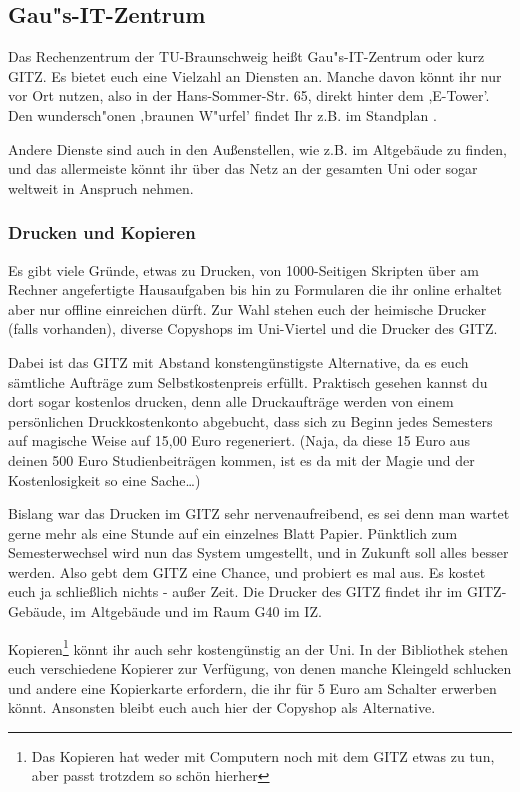 \subsection{Gau"s-IT-Zentrum}
Das Rechenzentrum der TU-Braunschweig heißt Gau"s-IT-Zentrum oder kurz GITZ. Es bietet euch eine Vielzahl an Diensten an. Manche davon könnt ihr nur vor Ort nutzen, also in der Hans-Sommer-Str. 65, direkt hinter dem ,E-Tower'. Den wundersch"onen ,braunen W"urfel' findet Ihr z.B. im Standplan .

Andere Dienste sind auch in den Außenstellen, wie z.B. im Altgebäude zu finden, und das allermeiste könnt ihr über das Netz an der gesamten Uni oder sogar weltweit in Anspruch nehmen.

\subsubsection{Drucken und Kopieren}
Es gibt viele Gründe, etwas zu Drucken, von 1000-Seitigen Skripten über am Rechner angefertigte Hausaufgaben bis hin zu Formularen die ihr online erhaltet aber nur offline einreichen dürft. Zur Wahl stehen euch der heimische Drucker (falls vorhanden), diverse Copyshops im Uni-Viertel und die Drucker des GITZ.

Dabei ist das GITZ mit Abstand konstengünstigste Alternative, da es euch sämtliche Aufträge zum Selbstkostenpreis erfüllt. Praktisch gesehen kannst du dort sogar kostenlos drucken, denn alle Druckaufträge werden von einem persönlichen Druckkostenkonto abgebucht, dass sich zu Beginn jedes Semesters auf magische Weise auf 15,00 Euro regeneriert. (Naja, da diese 15 Euro aus deinen 500 Euro Studienbeiträgen kommen, ist es da mit der Magie und der Kostenlosigkeit so eine Sache\ldots)

Bislang war das Drucken im GITZ sehr nervenaufreibend, es sei denn man wartet gerne mehr als eine Stunde auf ein einzelnes Blatt Papier. Pünktlich zum Semesterwechsel wird nun das System umgestellt, und in Zukunft soll alles besser werden. Also gebt dem GITZ eine Chance, und probiert es mal aus. Es kostet euch ja schließlich nichts - außer Zeit. Die Drucker des GITZ findet ihr im GITZ-Gebäude, im Altgebäude und im Raum G40 im IZ.

Kopieren\footnote{Das Kopieren hat weder mit Computern noch mit dem GITZ etwas zu tun, aber passt trotzdem so schön hierher} könnt ihr auch sehr kostengünstig an der Uni. In der Bibliothek stehen euch verschiedene Kopierer zur Verfügung, von denen manche Kleingeld schlucken und andere eine Kopierkarte erfordern, die ihr für 5 Euro am Schalter erwerben könnt. Ansonsten bleibt euch auch hier der Copyshop als Alternative.

